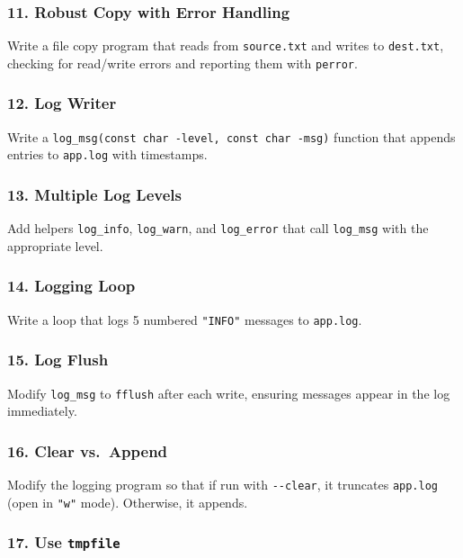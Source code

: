 \documentclass[
  letterpaper,
  DIV=11,
  numbers=noendperiod]{scrreprt}
\begin{document}
\subsubsection{11. Robust Copy with Error
Handling}\label{robust-copy-with-error-handling}

Write a file copy program that reads from \texttt{source.txt} and writes
to \texttt{dest.txt}, checking for read/write errors and reporting them
with \texttt{perror}.

\subsubsection{12. Log Writer}\label{log-writer}

Write a \texttt{log\_msg(const\ char\ -level,\ const\ char\ -msg)}
function that appends entries to \texttt{app.log} with timestamps.

\subsubsection{13. Multiple Log Levels}\label{multiple-log-levels}

Add helpers \texttt{log\_info}, \texttt{log\_warn}, and
\texttt{log\_error} that call \texttt{log\_msg} with the appropriate
level.

\subsubsection{14. Logging Loop}\label{logging-loop}

Write a loop that logs 5 numbered \texttt{"INFO"} messages to
\texttt{app.log}.

\subsubsection{15. Log Flush}\label{log-flush}

Modify \texttt{log\_msg} to \texttt{fflush} after each write, ensuring
messages appear in the log immediately.

\subsubsection{16. Clear vs.~Append}\label{clear-vs.-append}

Modify the logging program so that if run with \texttt{-\/-clear}, it
truncates \texttt{app.log} (open in \texttt{"w"} mode). Otherwise, it
appends.

\subsubsection{\texorpdfstring{17. Use
\texttt{tmpfile}}{17. Use tmpfile}}\label{use-tmpfile}
\end{document}
